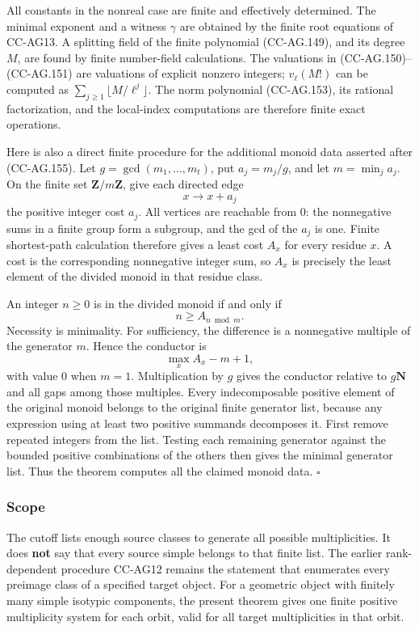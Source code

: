 All constants in the nonreal case are finite and effectively determined.
The minimal exponent and a witness \(\gamma\) are obtained by the finite
root equations of CC-AG13. A splitting field of the finite polynomial
(CC-AG.149), and its degree \(M\), are found by finite number-field
calculations. The valuations in (CC-AG.150)--(CC-AG.151) are valuations
of explicit nonzero integers; \(v_\ell(M!)\) can be computed as
\(\sum_{j\ge1}\lfloor M/\ell^j\rfloor\). The norm polynomial
(CC-AG.153), its rational factorization, and the local-index
computations are therefore finite exact operations.

Here is also a direct finite procedure for the additional monoid data
asserted after (CC-AG.155). Let \(g=\gcd(m_1,\ldots,m_t)\), put
\(a_j=m_j/g\), and let \(m=\min_j a_j\). On the finite set
\(\mathbf Z/m\mathbf Z\), give each directed edge \[
                     x\longrightarrow x+a_j
\] the positive integer cost \(a_j\). All vertices are reachable from
\(0\): the nonnegative sums in a finite group form a subgroup, and the
gcd of the \(a_j\) is one. Finite shortest-path calculation therefore
gives a least cost \(A_x\) for every residue \(x\). A cost is the
corresponding nonnegative integer sum, so \(A_x\) is precisely the least
element of the divided monoid in that residue class.

An integer \(n\ge0\) is in the divided monoid if and only if \[
                          n\ge A_{n\bmod m}.
 \tag{CC-AG.169}
\] Necessity is minimality. For sufficiency, the difference is a
nonnegative multiple of the generator \(m\). Hence the conductor is \[
                         \max_x A_x-m+1,
 \tag{CC-AG.170}
\] with value \(0\) when \(m=1\). Multiplication by \(g\) gives the
conductor relative to \(g\mathbf N\) and all gaps among those multiples.
Every indecomposable positive element of the original monoid belongs to
the original finite generator list, because any expression using at
least two positive summands decomposes it. First remove repeated
integers from the list. Testing each remaining generator against the
bounded positive combinations of the others then gives the minimal
generator list. Thus the theorem computes all the claimed monoid data.
\(\square\)

\subsubsection{Scope}\label{scope}

The cutoff lists enough source classes to generate all possible
multiplicities. It does \textbf{not} say that every source simple
belongs to that finite list. The earlier rank-dependent procedure
CC-AG12 remains the statement that enumerates every preimage class of a
specified target object. For a geometric object with finitely many
simple isotypic components, the present theorem gives one finite
positive multiplicity system for each orbit, valid for all target
multiplicities in that orbit.

